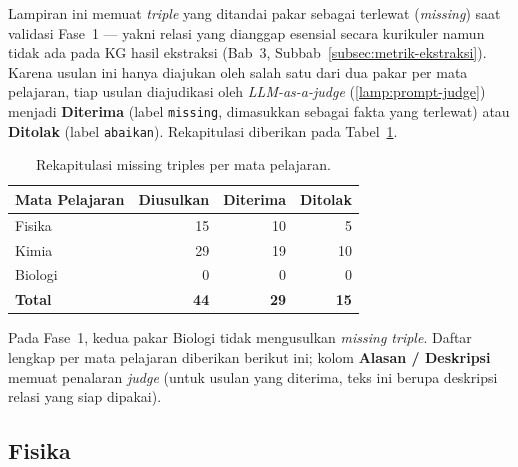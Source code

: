 \documentclass[../../thesis]{subfiles}
\begin{document}
\ifSubfilesClassLoaded{}{\appendix\setcounter{chapter}{6}}

\label{lamp:missing-triples}

Lampiran ini memuat \textit{triple} yang ditandai pakar sebagai terlewat
(\textit{missing}) saat validasi Fase~1 --- yakni relasi yang dianggap esensial
secara kurikuler namun tidak ada pada KG hasil ekstraksi (Bab~3,
Subbab~\ref{subsec:metrik-ekstraksi}). Karena usulan ini hanya diajukan oleh
salah satu dari dua pakar per mata pelajaran, tiap usulan diajudikasi oleh
\textit{LLM-as-a-judge} (\ref{lamp:prompt-judge}) menjadi
\textbf{Diterima} (label \texttt{missing}, dimasukkan sebagai fakta yang
terlewat) atau \textbf{Ditolak} (label \texttt{abaikan}). Rekapitulasi diberikan
pada Tabel~\ref{tab:mt-rekap}.

\begin{table}[h]
  \centering
  \caption{Rekapitulasi missing triples per mata pelajaran.}
  \label{tab:mt-rekap}
  \footnotesize
  \begin{tabularx}{\linewidth}{@{}X r r r@{}}
    \toprule
    \textbf{Mata Pelajaran} & \textbf{Diusulkan} & \textbf{Diterima} & \textbf{Ditolak} \\
    \midrule
    Fisika & 15 & 10 & 5 \\
    Kimia & 29 & 19 & 10 \\
    Biologi & 0 & 0 & 0 \\
    \midrule
    \textbf{Total} & \textbf{44} & \textbf{29} & \textbf{15} \\
    \bottomrule
  \end{tabularx}
\end{table}

\noindent Pada Fase~1, kedua pakar Biologi tidak mengusulkan \textit{missing
triple}. Daftar lengkap per mata pelajaran diberikan berikut ini; kolom
\textbf{Alasan / Deskripsi} memuat penalaran \textit{judge} (untuk usulan yang
diterima, teks ini berupa deskripsi relasi yang siap dipakai).

\subsection{Fisika}
\label{lamp:mt-fisika}
\end{document}
